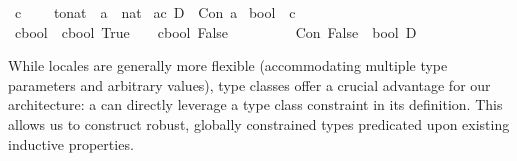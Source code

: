 \begin{isabellebody}\isanewline
{}\isamarkupfalse%
\ c\ {\isacharequal}{\kern0pt}\isanewline
\ \ \ tonat\ {\isacharcolon}{\kern0pt}{\isacharcolon}{\kern0pt}\ {\isachardoublequoteopen}{\isacharprime}{\kern0pt}a\ {\isasymRightarrow}\ nat{\isachardoublequoteclose}\isanewline
\isanewline
{}\isamarkupfalse%
\ {\isacharprime}{\kern0pt}a{\isacharcolon}{\kern0pt}{\isacharcolon}{\kern0pt}c\ D\ {\isacharequal}{\kern0pt}\ Con\ {\isacharprime}{\kern0pt}a\isanewline
\isanewline
{}\isamarkupfalse%
\ bool\ {\isacharcolon}{\kern0pt}{\isacharcolon}{\kern0pt}\ c\ \isanewline
\ \ \isamarkupfalse%
\ c{\isacharunderscore}{\kern0pt}bool\ \ {\isachardoublequoteopen}c{\isacharunderscore}{\kern0pt}bool\ True\ {\isacharequal}{\kern0pt}\ {}{\isachardoublequoteclose}\ {\isacharbar}{\kern0pt}\ {\isachardoublequoteopen}c{\isacharunderscore}{\kern0pt}bool\ False\ {\isacharequal}{\kern0pt}\ {}{\isachardoublequoteclose}\isanewline
\ \ \isamarkupfalse%
%
%
\ \isakeywordONE{{\isachardot}{\kern0pt}{\isachardot}{\kern0pt}}\isamarkupfalse%
\ \isanewline
{}\isamarkupfalse%
\isanewline
\isanewline
{}\isamarkupfalse%
\ {\isachardoublequoteopen}Con\ False\ {\isacharcolon}{\kern0pt}{\isacharcolon}{\kern0pt}\ bool\ D{\isachardoublequoteclose}\isanewline
\end{isabellebody}

While locales are generally more flexible (accommodating multiple type parameters and arbitrary values),
type classes offer a crucial advantage for our architecture:
a  can directly leverage a type class constraint in its definition. 
This allows us to construct robust, globally constrained types predicated upon existing inductive properties.

